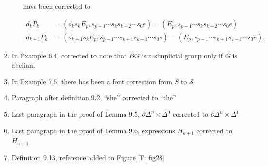 \documentclass[12pt]{article}
\theoremstyle{plain}
\theoremstyle{definition}
\theoremstyle{remark}
\newcommand{\bd}{\partial}
\newcommand{\ms}[1]{\mathscr{#1}}
\begin{document}
\begin{enumerate}
\begin{enumerate}
have been corrected to

\begin{align*}
d_kP_k&=(d_ks_k E_p, s_{p-1}\cdots s_{k}s_{k-2} \cdots s_{0} e)=(E_p, s_{p-1}\cdots s_{k}s_{k-2} \cdots s_{0} e)\\
d_{k+1}P_k&=(d_{k+1}s_k E_p, s_{p-1}\cdots s_{k+1}s_{k-1} \cdots s_{0} e)=(E_p, s_{p-1}\cdots s_{k+1}s_{k-1} \cdots s_{0} e).
\end{align*}
\end{enumerate}


\item In Example 6.4, corrected to note that $BG$ is a simplicial group only if $G$ is abelian. 


\item In Example 7.6, there has been a font correction from $S$ to $\ms S$

\item Paragraph after definition 9.2, ``she'' corrected to ``the''

\item Last paragraph in the proof of Lemma 9.5, $\bd \Delta^n\times \Delta^0$ corrected to $\bd \Delta^n\times \Delta^1$

\item Last paragraph in the proof of Lemma 9.6, expressions $H_{k+1}$ corrected to $H_{n+1}$ 

\item Definition 9.13, reference added to Figure \ref{F: fig28}
\end{enumerate}
\end{document}
